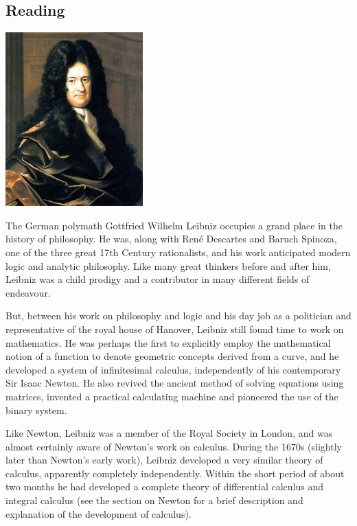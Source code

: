 


\subsection*{Reading}
\begin{center}
  \includegraphics[height=0.2\textheight]{leibniz}
\end{center}

The German polymath Gottfried Wilhelm Leibniz occupies a grand place in the history of philosophy. He was, along with René Descartes and Baruch Spinoza, one of the three great 17th Century rationalists, and his work anticipated modern logic and analytic philosophy. Like many great thinkers before and after him, Leibniz was a child prodigy and a contributor in many different fields of endeavour.

But, between his work on philosophy and logic and his day job as a politician and representative of the royal house of Hanover, Leibniz still found time to work on mathematics. He was perhaps the first to explicitly employ the mathematical notion of a function to denote geometric concepts derived from a curve, and he developed a system of infinitesimal calculus, independently of his contemporary Sir Isaac Newton. He also revived the ancient method of solving equations using matrices, invented a practical calculating machine and pioneered the use of the binary system.

Like Newton, Leibniz was a member of the Royal Society in London, and was almost certainly aware of Newton’s work on calculus. During the 1670s (slightly later than Newton’s early work), Leibniz developed a very similar theory of calculus, apparently completely independently. Within the short period of about two months he had developed a complete theory of differential calculus and integral calculus (see the section on Newton for a brief description and explanation of the development of calculus).

